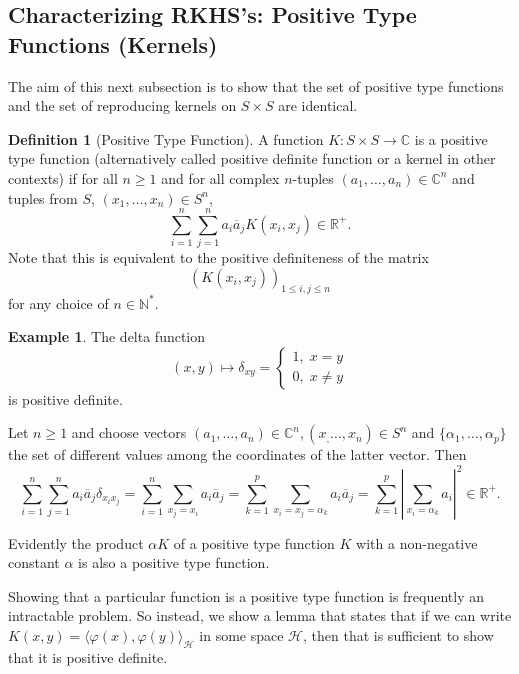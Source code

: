 \documentclass{article}
\theoremstyle{definition}
\newtheorem{exmp}[thm]{Example}
\newtheorem{defn}[thm]{Definition}
\theoremstyle{remark}
\numberwithin{equation}{section}
\begin{document}
\subsection{Characterizing RKHS's: Positive Type Functions (Kernels)}
The aim of this next subsection is to show that the set of positive type functions and the set of reproducing kernels on $S \times S$ are identical. 
\begin{defn}[Positive Type Function]
A function $K: S \times S \rightarrow \mathbb{C}$ is a positive type function (alternatively called positive definite function or a kernel in other contexts) if for all $n \geq 1$ and for all complex $n$-tuples $(a_1, \dots , a_n) \in \mathbb{C}^n$ and tuples from $S$, $(x_1, \dots , x_n) \in S^n$, 
$$\sum ^n _{i = 1} \sum _{j = 1} ^n a_i \overline{a}_j K(x_i, x_j) \in \mathbb{R}^+.$$
Note that this is equivalent to the positive definiteness of the matrix 
$$(K(x_i, x_j))_{1 \leq i, j \leq n} $$
for any choice of $n \in \mathbb{N}^*$. 
\end{defn}

\begin{exmp} The delta function 
$$(x, y) \mapsto \delta _{xy}  = \begin{cases} 1, \;  x=y \\ 0, \;  x \neq y \end{cases} $$
is positive definite. 

Let $n \geq 1$ and choose vectors $(a_1, \dots , a_n) \in \mathbb{C}^n, (x_, \dots , x_n) \in S^n$ and $\{ \alpha _1, \dots , \alpha _p \}$ the set of different values among the coordinates of the latter vector. Then 
$$\sum ^n _{i =1} \sum ^n _{j =1} a_i \overline{a}_j \delta_{x_ix_j} = \sum ^n _{i =1} \sum _{x_j = x_i} a_i \overline{a}_j = \sum ^p _{k =1} \sum _{x_i = x_j = \alpha _k} a_i \overline{a}_j = \sum ^p _{k =1} \left| \sum _{x_i = \alpha _k} a_i\right| ^2 \in \mathbb{R}^+ .$$

Evidently the product $\alpha K$ of a positive type function $K$ with a non-negative constant $\alpha$ is also a positive type function. 

\end{exmp}

Showing that a particular function is a positive type function is frequently an intractable problem. So instead, we show a lemma that states that if we can write $K(x,y) = \langle \varphi (x), \varphi (y) \rangle_{\mathcal{H}}$ in some space $\mathcal{H}$, then that is sufficient to show that it is positive definite. 
\end{document}
